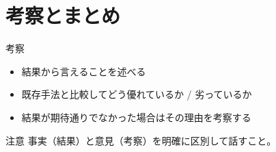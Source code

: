 \documentclass[uplatex,dvipdfmx,aspectratio=169]{beamer}
\begin{document}


\section{考察とまとめ}

\begin{frame}{考察}
  \begin{itemize}
    \item 結果から言えることを述べる
    \item 既存手法と比較してどう優れているか / 劣っているか
    \item 結果が期待通りでなかった場合はその理由を考察する
  \end{itemize}
  \pause
  \begin{alertblock}{注意}
    事実（結果）と意見（考察）を明確に区別して話すこと。
  \end{alertblock}
\end{frame}
\end{document}
